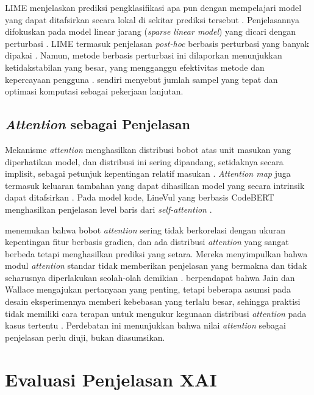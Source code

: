 LIME menjelaskan prediksi pengklasifikasi apa pun
dengan mempelajari model yang dapat ditafsirkan secara lokal di sekitar prediksi tersebut \autocite{ribeiro2016}.
Penjelasannya difokuskan pada model linear jarang (\textit{sparse linear model}) yang dicari dengan perturbasi \autocite{ribeiro2016}.
LIME termasuk penjelasan \textit{post-hoc} berbasis perturbasi yang banyak dipakai \autocite{zhou2021}.
Namun, metode berbasis perturbasi ini dilaporkan menunjukkan ketidakstabilan yang besar,
yang mengganggu efektivitas metode dan kepercayaan pengguna \autocite{zhou2021}.
\textcite{ribeiro2016} sendiri menyebut jumlah sampel yang tepat dan optimasi komputasi sebagai pekerjaan lanjutan.

\subsection{\textit{Attention} sebagai Penjelasan}
\label{sec:attention}
Mekanisme \textit{attention} menghasilkan distribusi bobot atas unit masukan yang diperhatikan model,
dan distribusi ini sering dipandang, setidaknya secara implisit, sebagai petunjuk kepentingan relatif masukan \autocite{jain2019}.
\textit{Attention map} juga termasuk keluaran tambahan yang dapat dihasilkan model yang secara intrinsik dapat ditafsirkan \autocite{hajimohammadkhani2023}.
Pada model kode, LineVul yang berbasis CodeBERT menghasilkan penjelasan level baris dari \textit{self-attention} \autocite{steenhoek2023}.

\textcite{jain2019} menemukan bahwa bobot \textit{attention} sering tidak berkorelasi dengan ukuran kepentingan fitur berbasis gradien,
dan ada distribusi \textit{attention} yang sangat berbeda tetapi menghasilkan prediksi yang setara.
Mereka menyimpulkan bahwa modul \textit{attention} standar tidak memberikan penjelasan yang bermakna
dan tidak seharusnya diperlakukan seolah-olah demikian \autocite{jain2019}.
\textcite{wiegreffe2019} berpendapat bahwa Jain dan Wallace mengajukan pertanyaan yang penting,
tetapi beberapa asumsi pada desain eksperimennya memberi kebebasan yang terlalu besar,
sehingga praktisi tidak memiliki cara terapan untuk mengukur kegunaan distribusi \textit{attention} pada kasus tertentu \autocite{wiegreffe2019}.
Perdebatan ini menunjukkan bahwa nilai \textit{attention} sebagai penjelasan perlu diuji, bukan diasumsikan.

\section{Evaluasi Penjelasan XAI}
\label{sec:evaluasi-xai}

